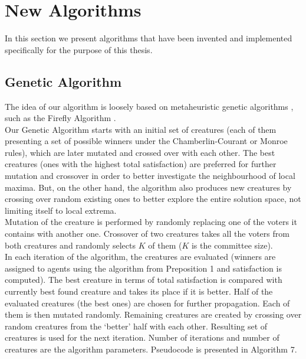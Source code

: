 \section{New Algorithms}

In this section we present algorithms that have been invented and implemented specifically for the purpose of this thesis.

\subsection{Genetic Algorithm}

The idea of our algorithm is loosely based on metaheuristic genetic algorithms \cite{13}, such as the Firefly Algorithm \cite{13, 6}.
\\

Our Genetic Algorithm starts with an initial set of creatures (each of them presenting a set of possible winners under the Chamberlin-Courant or Monroe rules), which are later mutated and crossed over with each other. The best creatures (ones with the highest total satisfaction) are preferred for further mutation and crossover in order to better investigate the neighbourhood of local maxima. But, on the other hand, the algorithm also produces new creatures by crossing over random existing ones to better explore the entire solution space, not limiting itself to local extrema.
\\

Mutation of the creature is performed by randomly replacing one of the voters it contains with another one. Crossover of two creatures takes all the voters from both creatures and randomly selects $K$ of them ($K$ is the committee size).
\\

In each iteration of the algorithm, the creatures are evaluated (winners are assigned to agents using the algorithm from Preposition 1 and satisfaction is computed). The best creature in terms of total satisfaction is compared with currently best found creature and takes its place if it is better. Half of the evaluated creatures (the best ones) are chosen for further propagation. Each of them is then mutated randomly. Remaining creatures are created by crossing over random creatures from the `better' half with each other. Resulting set of creatures is used for the next iteration. Number of iterations and number of creatures are the algorithm parameters. Pseudocode is presented in Algorithm 7.


